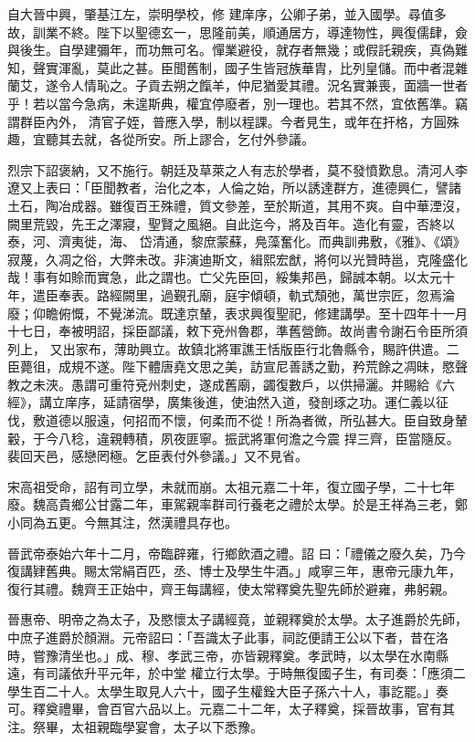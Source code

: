 \begin{pinyinscope}
 自大晉中興，肇基江左，崇明學校，修
 建庠序，公卿子弟，並入國學。尋值多故，訓業不終。陛下以聖德玄一，思隆前美，順通居方，導達物性，興復儒肆，僉與後生。自學建彌年，而功無可名。憚業避役，就存者無幾；或假託親疾，真偽難知，聲實渾亂，莫此之甚。臣聞舊制，國子生皆冠族華胄，比列皇儲。而中者混雜蘭艾，遂令人情恥之。子貢去朔之餼羊，仲尼猶愛其禮。況名實兼喪，面牆一世者乎！若以當今急病，未遑斯典，權宜停廢者，別一理也。若其不然，宜依舊準。竊謂群臣內外，
 清官子姪，普應入學，制以程課。今者見生，或年在扞格，方圓殊趣，宜聽其去就，各從所安。所上謬合，乞付外參議。



 烈宗下詔褒納，又不施行。朝廷及草萊之人有志於學者，莫不發憤歎息。清河人李遼又上表曰：「臣聞教者，治化之本，人倫之始，所以誘達群方，進德興仁，譬諸土石，陶冶成器。雖復百王殊禮，質文參差，至於斯道，其用不爽。自中華湮沒，闕里荒毀，先王之澤寢，聖賢之風絕。自此迄今，將及百年。造化有靈，否終以泰，河、濟夷徙，海、
 岱清通，黎庶蒙蘇，鳧藻奮化。而典訓弗敷，《雅》、《頌》寂蔑，久凋之俗，大弊未改。非演迪斯文，緝熙宏猷，將何以光贊時邕，克隆盛化哉！事有如賒而實急，此之謂也。亡父先臣回，綏集邦邑，歸誠本朝。以太元十年，遣臣奉表。路經闕里，過覲孔廟，庭宇傾頓，軌式頹弛，萬世宗匠，忽焉淪廢；仰瞻俯慨，不覺涕流。既達京輦，表求興復聖祀，修建講學。至十四年十一月十七日，奉被明詔，採臣鄙議，敕下兗州魯郡，準舊營飾。故尚書令謝石令臣所須列上，
 又出家布，薄助興立。故鎮北將軍譙王恬版臣行北魯縣令，賜許供遣。二臣薨徂，成規不遂。陛下體唐堯文思之美，訪宣尼善誘之勤，矜荒餘之凋昧，愍聲教之未浹。愚謂可重符兗州刺史，遂成舊廟，蠲復數戶，以供掃灑。并賜給《六經》，講立庠序，延請宿學，廣集後進，使油然入道，發剖琢之功。運仁義以征伐，敷道德以服遠，何招而不懷，何柔而不從！所為者微，所弘甚大。臣自致身輦轂，于今八稔，違親轉積，夙夜匪寧。振武將軍何澹之今震
 捍三齊，臣當隨反。裴回天邑，感戀罔極。乞臣表付外參議。」又不見省。



 宋高祖受命，詔有司立學，未就而崩。太祖元嘉二十年，復立國子學，二十七年廢。魏高貴鄉公甘露二年，車駕親率群司行養老之禮於太學。於是王祥為三老，鄭小同為五更。今無其注，然漢禮具存也。



 晉武帝泰始六年十二月，帝臨辟雍，行鄉飲酒之禮。詔
 曰：「禮儀之廢久矣，乃今復講肄舊典。賜太常絹百匹，丞、博士及學生牛酒。」咸寧三年，惠帝元康九年，復行其禮。魏齊王正始中，齊王每講經，使太常釋奠先聖先師於避雍，弗躬親。



 晉惠帝、明帝之為太子，及愍懷太子講經竟，並親釋奠於太學。太子進爵於先師，中庶子進爵於顏淵。元帝詔曰：「吾識太子此事，祠訖便請王公以下者，昔在洛時，嘗豫清坐也。」成、穆、孝武三帝，亦皆親釋奠。孝武時，以太學在水南縣遠，有司議依升平元年，於中堂
 權立行太學。于時無復國子生，有司奏：「應須二學生百二十人。太學生取見人六十，國子生權銓大臣子孫六十人，事訖罷。」奏可。釋奠禮畢，會百官六品以上。元嘉二十二年，太子釋奠，採晉故事，官有其注。祭畢，太祖親臨學宴會，太子以下悉豫。




\end{pinyinscope}
